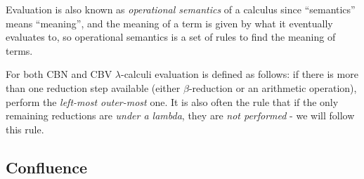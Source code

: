 \documentclass{article}
\newcommand{\lam}{\lambda}
\begin{document}
Evaluation is also known as \textit{operational semantics} of a calculus since ``semantics'' means ``meaning'', and the meaning of a term is given by what it eventually evaluates to, so operational semantics is a set of rules to find the meaning of terms. 

For both CBN and CBV $\lam$-calculi evaluation is defined as follows: if there is more than one reduction step available (either $\beta$-reduction or an arithmetic operation), perform the \textit{left-most outer-most} one. It is also often the rule that if the only remaining reductions are \textit{under a lambda}, they are \textit{not performed} - we will follow this rule. 



\subsection{Confluence}\label{confluence}
\end{document}
